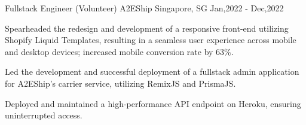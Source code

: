 \cventry
{Fullstack Engineer (Volunteer)} %
{A2EShip \href{https://a2eshop.sg/}{\faExternalLink*}} %
{Singapore, SG}
{Jan,2022 - Dec,2022}
{
  \begin{cvitems} %
    \item {Spearheaded the redesign and development of a responsive front-end utilizing Shopify Liquid Templates, resulting in a seamless user experience across mobile and desktop devices; increased mobile conversion rate by 63\%.}
    \item {Led the development and successful deployment of a fullstack admin application for A2EShip's carrier service, utilizing RemixJS and PrismaJS.}
  \item {Deployed and maintained a high-performance API endpoint on Heroku, ensuring uninterrupted access.}
  \end{cvitems}
}
